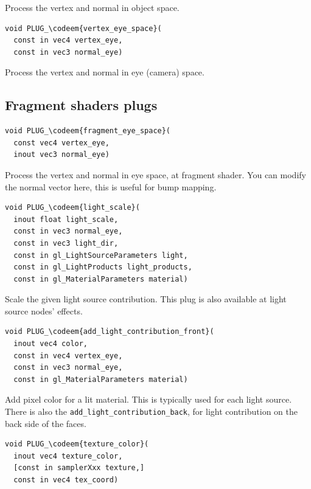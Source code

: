 \documentclass{acmsiggraph}                     %
\newcommand*{\codeem}[1]{\textbf{#1}}
\begin{document}
Process the vertex and normal in object space.

\begin{Verbatim}[commandchars=\\\{\},frame=single]
void PLUG_\codeem{vertex_eye_space}(
  const in vec4 vertex_eye,
  const in vec3 normal_eye)
\end{Verbatim}

Process the vertex and normal in eye (camera) space.

\subsection{Fragment shaders plugs}

\begin{Verbatim}[commandchars=\\\{\},frame=single]
void PLUG_\codeem{fragment_eye_space}(
  const vec4 vertex_eye,
  inout vec3 normal_eye)
\end{Verbatim}

Process the vertex and normal in eye space, at fragment shader.
You can modify the normal vector here, this is useful for bump mapping.

\begin{Verbatim}[commandchars=\\\{\},frame=single]
void PLUG_\codeem{light_scale}(
  inout float light_scale,
  const in vec3 normal_eye,
  const in vec3 light_dir,
  const in gl_LightSourceParameters light,
  const in gl_LightProducts light_products,
  const in gl_MaterialParameters material)
\end{Verbatim}

Scale the given light source contribution.
This plug is also available at light source nodes' effects.

\begin{Verbatim}[commandchars=\\\{\},frame=single]
void PLUG_\codeem{add_light_contribution_front}(
  inout vec4 color,
  const in vec4 vertex_eye,
  const in vec3 normal_eye,
  const in gl_MaterialParameters material)
\end{Verbatim}

Add pixel color for a lit material. This is typically used for each light source.
There is also the \texttt{add\_light\_contribution\_back},
for light contribution on the back side of the faces.

\begin{Verbatim}[commandchars=\\\{\},frame=single]
void PLUG_\codeem{texture_color}(
  inout vec4 texture_color,
  [const in samplerXxx texture,]
  const in vec4 tex_coord)
\end{Verbatim}
\end{document}
